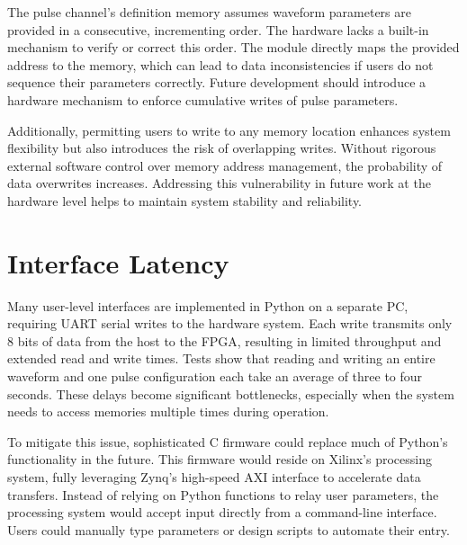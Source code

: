 The pulse channel's definition memory assumes waveform parameters are provided in a consecutive, incrementing order. The hardware lacks a built-in mechanism to verify or correct this order. The module directly maps the provided address to the memory, which can lead to data inconsistencies if users do not sequence their parameters correctly. Future development should introduce a hardware mechanism to enforce cumulative writes of pulse parameters.

Additionally, permitting users to write to any memory location enhances system flexibility but also introduces the risk of overlapping writes. Without rigorous external software control over memory address management, the probability of data overwrites increases. Addressing this vulnerability in future work at the hardware level helps to maintain system stability and reliability.

\section{Interface Latency}
Many user-level interfaces are implemented in Python on a separate PC, requiring UART serial writes to the hardware system. Each write transmits only 8 bits of data from the host to the FPGA, resulting in limited throughput and extended read and write times. Tests show that reading and writing an entire waveform and one pulse configuration each take an average of three to four seconds. These delays become significant bottlenecks, especially when the system needs to access memories multiple times during operation.

To mitigate this issue, sophisticated C firmware could replace much of Python's functionality in the future. This firmware would reside on Xilinx's processing system, fully leveraging Zynq's high-speed AXI interface to accelerate data transfers. Instead of relying on Python functions to relay user parameters, the processing system would accept input directly from a command-line interface. Users could manually type parameters or design scripts to automate their entry.